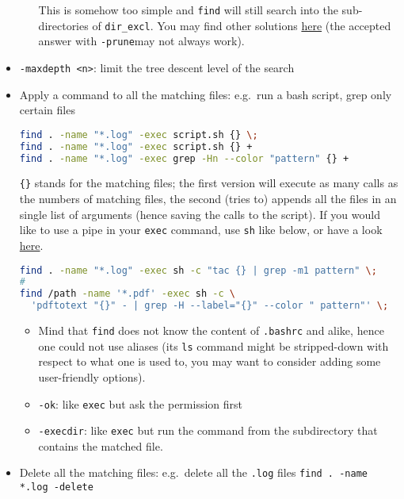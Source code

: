 \documentclass[a4paper,12pt,%
              final%
              ]{article}
\begin{document}
\begin{itemize}
\begin{itemize}
\begin{lstlisting}[language=bash]
\end{lstlisting}
        This is somehow too simple and \texttt{find} will still search into the sub-directories of \verb|dir_excl|. You may find other solutions \href{https://stackoverflow.com/questions/4210042/how-to-exclude-a-directory-in-find-command}{here} (the accepted answer with \verb|-prune|may not always work).
    \end{itemize}
  \item \verb|-maxdepth <n>|: limit the tree descent level of the search
  \item Apply a command to all the matching files: e.g.\ run a bash script, grep only certain files
\begin{lstlisting}[language=bash]
find . -name "*.log" -exec script.sh {} \;
find . -name "*.log" -exec script.sh {} +
find . -name "*.log" -exec grep -Hn --color "pattern" {} +
\end{lstlisting}
    \verb|{}| stands for the matching files; the first version will execute as many calls as the numbers of matching files, the second (tries to) appends all the files in an single list of arguments (hence saving the calls to the script). If you would like to use a pipe in your \texttt{exec} command, use \texttt{sh} like below, or have a look \href{https://stackoverflow.com/questions/307015/how-do-i-include-a-pipe-in-my-linux-find-exec-command}{here}.
\begin{lstlisting}[language=bash]
find . -name "*.log" -exec sh -c "tac {} | grep -m1 pattern" \;
#
find /path -name '*.pdf' -exec sh -c \
  'pdftotext "{}" - | grep -H --label="{}" --color " pattern"' \;
\end{lstlisting}
  \begin{itemize}
    \item Mind that \texttt{find} does not know the content of \texttt{.bashrc} and alike, hence one could not use aliases (its \texttt{ls} command might be stripped-down with respect to what one is used to, you may want to consider adding some user-friendly options).
  \end{itemize}
  \begin{itemize}
    \item \verb|-ok|: like \texttt{exec} but ask the permission first
    \item \verb|-execdir|: like \texttt{exec} but run the command from the subdirectory that contains the matched file.
  \end{itemize}
  \item Delete all the matching files: e.g.\ delete all the \texttt{.log} files \texttt{find . -name *.log -delete}

\end{itemize}
\end{document}
